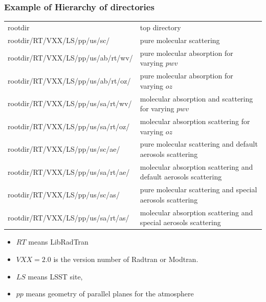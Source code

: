 \documentclass{beamer}
\begin{document}


\begin{frame}
\frametitle{Example of Hierarchy of directories}
\begin{table}
{\tiny
\begin{tabular}{ l l}
  rootdir &  top directory \\
 rootdir/RT/VXX/LS/pp/us/sc/ & pure molecular scattering \\
 rootdir/RT/VXX/LS/pp/us/ab/rt/wv/ & pure molecular absorption for varying $pwv$ \\
 rootdir/RT/VXX/LS/pp/us/ab/rt/oz/ & pure molecular absorption for varying $oz$ \\
 rootdir/RT/VXX/LS/pp/us/sa/rt/wv/ & molecular absorption and scattering for varying $pwv$ \\
 rootdir/RT/VXX/LS/pp/us/sa/rt/oz/ & molecular absorption scattering for varying $oz$ \\
 rootdir/RT/VXX/LS/pp/us/sc/ae/ & pure molecular scattering and default aerosols scattering \\
 rootdir/RT/VXX/LS/pp/us/sa/rt/ae/ & molecular absorption scattering and default aerosols scattering \\
 rootdir/RT/VXX/LS/pp/us/sc/as/ & pure molecular scattering and special aerosols scattering \\
 rootdir/RT/VXX/LS/pp/us/sa/rt/as/ & molecular absorption scattering and special aerosols scattering \\
\end{tabular}
}
\end{table}
{\scriptsize
\begin{itemize}
\item $RT$ means LibRadTran
\item $VXX=2.0$ is the version number of Radtran or Modtran.
\item $LS$ means LSST site,
\item $pp$ means geometry of parallel planes for the atmosphere
\end{itemize}
}
\end{frame}
\end{document}
